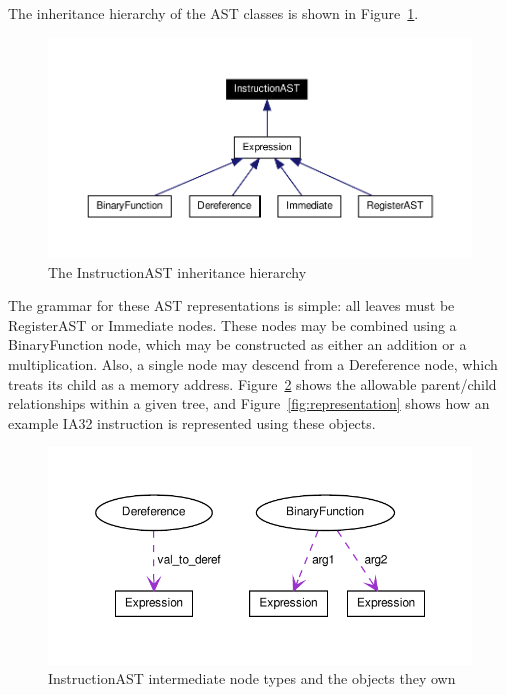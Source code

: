 The inheritance hierarchy of the AST classes is shown in
Figure~\ref{fig:inheritance}. 
\begin{figure}
    \centering
\includegraphics{fig/full_inheritance_graph}
\caption{The InstructionAST inheritance hierarchy}
\label{fig:inheritance}
\end{figure}

The grammar for these AST representations is simple: all leaves must be
RegisterAST or Immediate nodes. These nodes may be combined using a
BinaryFunction node, which may be constructed as either an addition or a
multiplication. Also, a single node may descend from a Dereference node, which
treats its child as a memory address. Figure~\ref{fig:ownership} shows the allowable parent/child
relationships within a given tree, and Figure~\ref{fig:representation} shows how an example IA32
instruction is represented using these objects. 

\begin{figure}
    \centering
\includegraphics{fig/ast_ownership}
\caption{InstructionAST intermediate node types and the objects they own}
\label{fig:ownership}
\end{figure}
 
